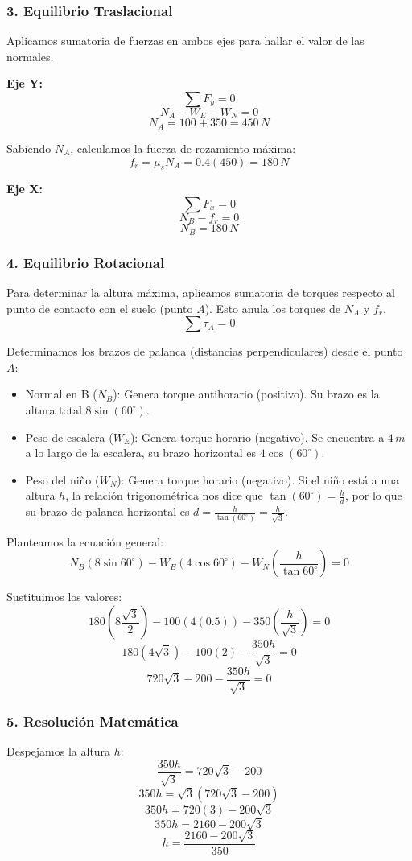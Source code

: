 \documentclass[12pt, a4paper]{article}
\begin{document}
\subsubsection*{3. Equilibrio Traslacional}
Aplicamos sumatoria de fuerzas en ambos ejes para hallar el valor de las normales.

\textbf{Eje Y:}
$$\sum F_y = 0$$
$$N_A - W_E - W_N = 0$$
$$N_A = 100 + 350 = 450 \, \si{N}$$

Sabiendo $N_A$, calculamos la fuerza de rozamiento máxima:
$$f_r = \mu_s N_A = 0.4(450) = 180 \, \si{N}$$

\textbf{Eje X:}
$$\sum F_x = 0$$
$$N_B - f_r = 0$$
$$N_B = 180 \, \si{N}$$

\subsubsection*{4. Equilibrio Rotacional}
Para determinar la altura máxima, aplicamos sumatoria de torques respecto al punto de contacto con el suelo (punto $A$). Esto anula los torques de $N_A$ y $f_r$.
$$\sum \tau_A = 0$$

Determinamos los brazos de palanca (distancias perpendiculares) desde el punto $A$:
\begin{itemize}
    \item Normal en B ($N_B$): Genera torque antihorario (positivo). Su brazo es la altura total $8 \sin(60^\circ)$.
    \item Peso de escalera ($W_E$): Genera torque horario (negativo). Se encuentra a $4 \, \si{m}$ a lo largo de la escalera, su brazo horizontal es $4 \cos(60^\circ)$.
    \item Peso del niño ($W_N$): Genera torque horario (negativo). Si el niño está a una altura $h$, la relación trigonométrica nos dice que $\tan(60^\circ) = \frac{h}{d}$, por lo que su brazo de palanca horizontal es $d = \frac{h}{\tan(60^\circ)} = \frac{h}{\sqrt{3}}$.
\end{itemize}

Planteamos la ecuación general:
$$N_B (8 \sin 60^\circ) - W_E (4 \cos 60^\circ) - W_N \left( \frac{h}{\tan 60^\circ} \right) = 0$$

Sustituimos los valores:
$$180 \left( 8 \frac{\sqrt{3}}{2} \right) - 100 \left( 4(0.5) \right) - 350 \left( \frac{h}{\sqrt{3}} \right) = 0$$
$$180 (4\sqrt{3}) - 100(2) - \frac{350h}{\sqrt{3}} = 0$$
$$720\sqrt{3} - 200 - \frac{350h}{\sqrt{3}} = 0$$

\subsubsection*{5. Resolución Matemática}
Despejamos la altura $h$:
$$\frac{350h}{\sqrt{3}} = 720\sqrt{3} - 200$$
$$350h = \sqrt{3}(720\sqrt{3} - 200)$$
$$350h = 720(3) - 200\sqrt{3}$$
$$350h = 2160 - 200\sqrt{3}$$
$$h = \frac{2160 - 200\sqrt{3}}{350}$$
\end{document}
